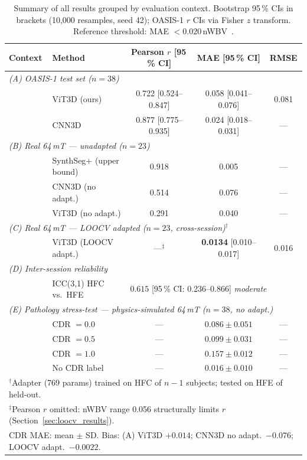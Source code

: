\documentclass[12pt,a4paper]{article}
\begin{document}
\begin{table}[!t]
\caption{Summary of all results grouped by evaluation context.
Bootstrap 95\,\% CIs in brackets (10{,}000 resamples, seed 42);
OASIS-1 $r$ CIs via Fisher $z$ transform.
Reference threshold: MAE $< 0.020$\,nWBV~\cite{buckner2004}.}
\label{tab:main}
\centering
\small
\setlength{\tabcolsep}{5pt}
\renewcommand{\arraystretch}{1.15}
\begin{tabular}{p{3.2cm} p{3.8cm} c c c}
\toprule
\textbf{Context} & \textbf{Method} & \textbf{Pearson $r$ [95\,\% CI]} & \textbf{MAE [95\,\% CI]} & \textbf{RMSE} \\
\midrule
\multicolumn{5}{l}{\textit{(A) OASIS-1 test set ($n=38$)}} \\[1pt]
  & ViT3D (ours)            & 0.722 [0.524--0.847] & 0.058 [0.041--0.076] & 0.081 \\
  & CNN3D                   & 0.877 [0.775--0.935] & 0.024 [0.018--0.031] & ---   \\
\midrule
\multicolumn{5}{l}{\textit{(B) Real 64\,mT --- unadapted ($n=23$)}} \\[1pt]
  & SynthSeg+ (upper bound) & 0.918        & 0.005 & --- \\
  & CNN3D (no adapt.)       & 0.514        & 0.076 & --- \\
  & ViT3D (no adapt.)       & 0.291        & 0.040 & --- \\
\midrule
\multicolumn{5}{l}{\textit{(C) Real 64\,mT --- LOOCV adapted ($n=23$, cross-session)$^\dagger$}} \\[1pt]
  & ViT3D (LOOCV adapt.)    & ---$^\ddagger$ & \textbf{0.0134} [0.010--0.017] & 0.016 \\
\midrule
\multicolumn{5}{l}{\textit{(D) Inter-session reliability}} \\[1pt]
  & ICC(3,1) HFC vs.\ HFE   & \multicolumn{3}{l}{$0.615$ [95\,\% CI: 0.236--0.866] \quad \textit{moderate}~\cite{koo2016icc}} \\
\midrule
\multicolumn{5}{l}{\textit{(E) Pathology stress-test --- physics-simulated 64\,mT ($n=38$, no adapt.)}} \\[1pt]
  & CDR $= 0.0$             & --- & $0.086 \pm 0.051$ & --- \\
  & CDR $= 0.5$             & --- & $0.099 \pm 0.031$ & --- \\
  & CDR $= 1.0$             & --- & $0.157 \pm 0.012$ & --- \\
  & No CDR label            & --- & $0.016 \pm 0.010$ & --- \\
\bottomrule
\multicolumn{5}{l}{\footnotesize $^\dagger$Adapter (769 params) trained on HFC of $n{-}1$ subjects; tested on HFE of held-out.}\\
\multicolumn{5}{l}{\footnotesize $^\ddagger$Pearson $r$ omitted: nWBV range 0.056 structurally limits $r$ (Section~\ref{sec:loocv_results}).}\\
\multicolumn{5}{l}{\footnotesize CDR MAE: mean $\pm$ SD. Bias: (A) ViT3D $+0.014$; CNN3D no adapt.\ $-0.076$; LOOCV adapt.\ $-0.0022$.}
\end{tabular}
\end{table}
\end{document}

